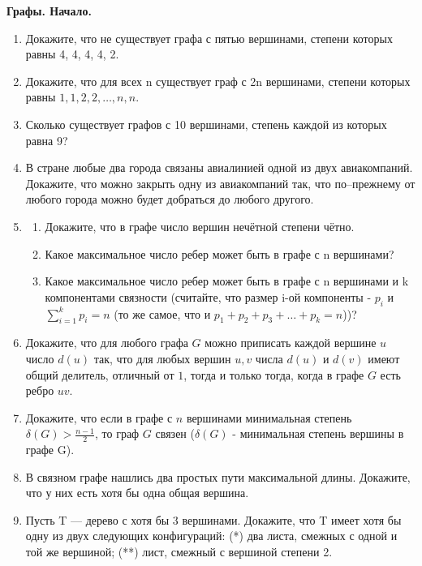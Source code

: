 \documentclass[a4paper,12pt]{article}
\begin{document}
\begin{center}
    {\Large \textbf{Графы. Начало.}}\\[0.5em]
\end{center}
    
\begin{enumerate}[label=\textbf{Задача \arabic*.}]
  \item Докажите, что не существует графа с пятью вершинами, степени которых равны 4, 4, 4, 4, 2.
  \item Докажите, что для всех n существует граф с 2n вершинами, степени которых равны $1, 1, 2, 2,\ldots, n,n$.
  \item
  Сколько существует графов с 10 вершинами, степень каждой из которых равна 9?
  \item В стране любые два города связаны авиалинией одной из двух авиакомпаний. Докажите, что можно закрыть одну из авиакомпаний так, что по–прежнему от любого города можно будет добраться до любого другого.
  \item
  \begin{enumerate}[label=\textbf{\alph*)}]
    \item Докажите, что в графе число вершин нечётной степени чётно.
    \item Какое максимальное число ребер может быть в графе с n вершинами?
    \item Какое максимальное число ребер может быть в графе с n вершинами и k компонентами связности (считайте, что размер i-ой компоненты - $p_i$ и $\displaystyle \sum_{i = 1}^{k}p_i = n$ (то же самое, что и $p_1 + p_2 + p_3 + \ldots + p_k = n$))?
  \end{enumerate}

  \item Докажите, что для любого графа \(G\) можно приписать каждой вершине \(u\) число \(d(u)\) так, что для любых вершин \(u,v\) числа \(d(u)\) и \(d(v)\) имеют общий делитель, отличный от \(1\), тогда и только тогда, когда в графе \(G\) есть ребро \(uv\).
  
  \item Докажите, что если в графе с \(n\) вершинами минимальная степень \(\delta(G) > \frac{n-1}{2}\), то граф \(G\) связен ($\delta(G)$ - минимальная степень вершины в графе G).

\item В связном графе нашлись два простых пути максимальной длины. Докажите, что у них есть хотя бы одна общая вершина.

\item Пусть T — дерево с хотя бы 3 вершинами. Докажите, что T имеет хотя бы одну из двух следующих конфигураций:
(*) два листа, смежных с одной и той же вершиной;
(**) лист, смежный с вершиной степени 2.


\end{enumerate}
\end{document}

